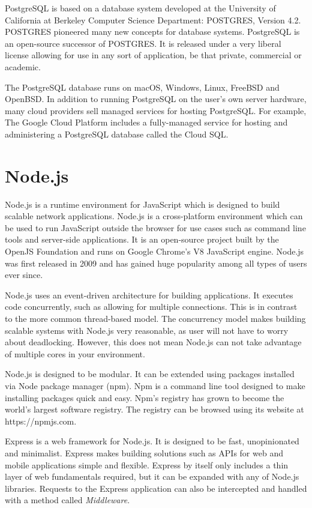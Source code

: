 PostgreSQL is based on a database system developed at the University of California at Berkeley Computer Science Department: POSTGRES, Version 4.2.
POSTGRES pioneered many new concepts for database systems.
PostgreSQL is an open-source successor of POSTGRES.
It is released under a very liberal license allowing for use in any sort of application, be that private, commercial or academic.
\cite{postgresql}

The PostgreSQL database runs on macOS, Windows, Linux, FreeBSD and Open\-BSD. \cite{postgresql}
In addition to running PostgreSQL on the user's own server hardware, many cloud providers sell managed services for hosting PostgreSQL.
For example, The Google Cloud Platform includes a fully-managed service for hosting and administering a PostgreSQL database called the Cloud SQL.
\cite{googlecloud}

\section{Node.js}

Node.js is a runtime environment for JavaScript which is designed to build scalable network applications.
Node.js is a cross-platform environment which can be used to run JavaScript outside the browser for use cases such as command line tools and server-side applications.
It is an open-source project built by the OpenJS Foundation and runs on Google Chrome's V8 JavaScript engine.
Node.js was first released in 2009 and has gained huge popularity among all types of users ever since.
\cite{nodejs}

Node.js uses an event-driven architecture for building applications.
It executes code concurrently, such as allowing for multiple connections.
This is in contrast to the more common thread-based model.
The concurrency model makes building scalable systems with Node.js very reasonable, as user will not have to worry about deadlocking.
However, this does not mean Node.js can not take advantage of multiple cores in your environment.
\cite{nodejs}

Node.js is designed to be modular.
It can be extended using packages installed via Node package manager (npm).
Npm is a command line tool designed to make installing packages quick and easy.
Npm's registry has grown to become the world's largest software registry.
The registry can be browsed using its website at https://npmjs.com.
\cite{npm-docs}

Express is a web framework for Node.js.
It is designed to be fast, unopinionated and minimalist.
Express makes building solutions such as APIs for web and mobile applications simple and flexible.
Express by itself only includes a thin layer of web fundamentals required, but it can be expanded with any of Node.js libraries.
Requests to the Express application can also be intercepted and handled with a method called \textit{Middleware}.
\cite{expressjs}

